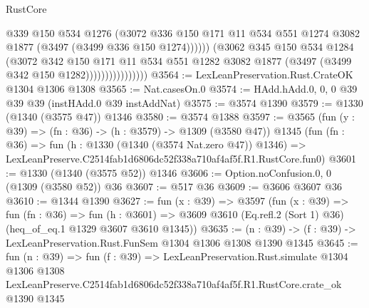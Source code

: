 \begin{lexlean}{RustCore}
\begin{coremodule}
                                  @339
                                  @150
                                  @534
                                  @1276
                                  (@3072
                                    @336
                                    @150
                                    @171
                                    @11
                                    @534
                                    @551
                                    @1274
                                    @3082
                                    @1877
                                    (@3497 (@3499 @336 @150 @1274))))))
                            (@3062
                              @345
                              @150
                              @534
                              @1284
                              (@3072
                                @342
                                @150
                                @171
                                @11
                                @534
                                @551
                                @1282
                                @3082
                                @1877
                                (@3497 (@3499 @342 @150 @1282))))))))))))))))
@3564 := LexLeanPreservation.Rust.CrateOK @1304 @1306 @1308
@3565 := Nat.casesOn.{0}
@3574 := HAdd.hAdd.{0, 0, 0} @39 @39 @39 (instHAdd.{0} @39 instAddNat)
@3575 := @3574 @1390
@3579 := @1330 (@1340 (@3575 @47)) @1346
@3580 := @3574 @1388
@3597 := @3565
    (fun (y : @39) => (fn : @36) -> (h : @3579) -> @1309 (@3580 @47))
    @1345
    (fun (fn : @36) =>
    fun (h : @1330 (@1340 (@3574 Nat.zero @47)) @1346) =>
    LexLeanPreserve.C2514fab1d6806dc52f338a710af4af5f.R1.RustCore.fun0)
@3601 := @1330 (@1340 (@3575 @52)) @1346
@3606 := Option.noConfusion.{0, 0} (@1309 (@3580 @52)) @36
@3607 := @517 @36
@3609 := @3606 @3607 @36
@3610 := @1344 @1390
@3627 := fun (x : @39) =>
  @3597
    (fun (x : @39) =>
    fun (fn : @36) =>
    fun (h : @3601) =>
    @3609 @3610 (Eq.refl.{2} (Sort 1) @36) (heq_of_eq.{1} @1329 @3607 @3610 @1345))
@3635 := (n : @39) -> (f : @39) -> LexLeanPreservation.Rust.FunSem @1304 @1306 @1308 @1390 @1345
@3645 := fun (n : @39) =>
  fun (f : @39) =>
  LexLeanPreservation.Rust.simulate
    @1304
    @1306
    @1308
    LexLeanPreserve.C2514fab1d6806dc52f338a710af4af5f.R1.RustCore.crate_ok
    @1390
    @1345
\end{coremodule}
\end{lexlean}

